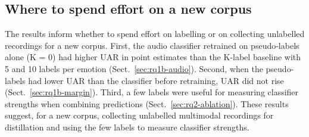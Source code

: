 \subsection{Where to spend effort on a new corpus}
The results inform whether to spend effort on labelling or on collecting unlabelled recordings for a new corpus. First, the audio classifier retrained on pseudo-labels alone (K = 0) had higher UAR in point estimates than the K-label baseline with 5 and 10 labels per emotion (Sect.~\ref{sec:rq1b-audio}). Second, when the pseudo-labels had lower UAR than the classifier before retraining, UAR did not rise (Sect.~\ref{sec:rq1b-margin}). Third, a few labels were useful for measuring classifier strengths when combining predictions (Sect.~\ref{sec:rq2-ablation}). These results suggest, for a new corpus, collecting unlabelled multimodal recordings for distillation and using the few labels to measure classifier strengths.
